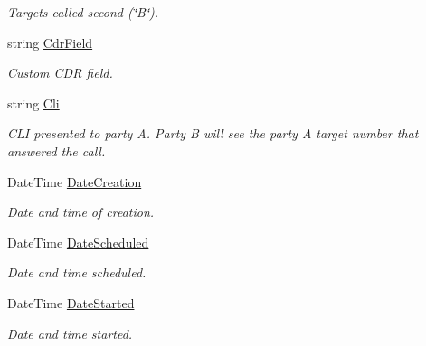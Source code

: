 \begin{DoxyCompactItemize}
\begin{DoxyCompactList}\small\item\em Targets called second (\char`\"{}\+B\char`\"{}). \end{DoxyCompactList}\item 
string \hyperlink{class_thecallr_api_1_1_objects_1_1_click_to_call_1_1_call_a5678a023993d4aebb7c436a9d60d1def}{Cdr\+Field}
\begin{DoxyCompactList}\small\item\em Custom C\+D\+R field. \end{DoxyCompactList}\item 
string \hyperlink{class_thecallr_api_1_1_objects_1_1_click_to_call_1_1_call_af2650b6ee1f0fe07a4afb29904e8812c}{Cli}
\begin{DoxyCompactList}\small\item\em C\+L\+I presented to party A. Party B will see the party A target number that answered the call. \end{DoxyCompactList}\item 
Date\+Time \hyperlink{class_thecallr_api_1_1_objects_1_1_click_to_call_1_1_call_a31aa6c9e2ee7c732832eed6dea689c1d}{Date\+Creation}
\begin{DoxyCompactList}\small\item\em Date and time of creation. \end{DoxyCompactList}\item 
Date\+Time \hyperlink{class_thecallr_api_1_1_objects_1_1_click_to_call_1_1_call_a239f72ff8873cc6357ea09f6f21639f1}{Date\+Scheduled}
\begin{DoxyCompactList}\small\item\em Date and time scheduled. \end{DoxyCompactList}\item 
Date\+Time \hyperlink{class_thecallr_api_1_1_objects_1_1_click_to_call_1_1_call_a2c41253671e6e7e7f642179509e090c2}{Date\+Started}
\begin{DoxyCompactList}\small\item\em Date and time started. \end{DoxyCompactList}\item 

\end{DoxyCompactItemize}
